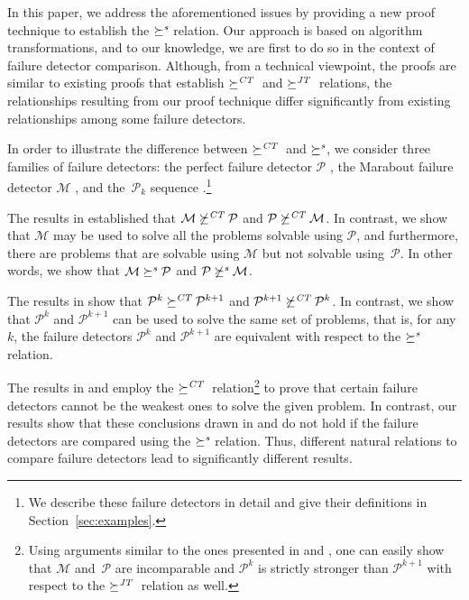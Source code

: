 \documentclass[11pt]{article}
\newcommand{\ident}[1]{\textit{#1}\rule{0cm}{1ex}}
\newcommand{\PFD}{\ensuremath{\mathcal{P}}}
\newcommand{\MFD}{\ensuremath{\mathcal{M}}}
\newcommand{\redCT}{\succeq^\ident{CT}}
\newcommand{\redJT}{\succeq^\ident{JT}}
\newcommand{\redSolv}{\succeq^{\ident{s}}}
\begin{document}
In this paper, we address the aforementioned issues by providing a new
     proof technique to establish the $\redSolv$ relation.
Our approach is based on algorithm transformations, and to our
     knowledge, we are first to do so in the context of failure
     detector comparison.
Although, from a technical viewpoint, the proofs are similar to
     existing proofs that establish $\redCT$ and $\redJT$ relations,
     the relationships resulting from our proof technique differ
     significantly from existing relationships among some failure
     detectors.
     
In order to illustrate the difference between $\redCT$ and $\redSolv$,
     we consider three families of failure detectors: the perfect
     failure detector $\PFD$ \cite{chan:ufdfr}, the Marabout failure
     detector $\MFD$ \cite{guer:01:hfap}, and the~$\PFD_{k}$ sequence
     \cite{bhatt:oteow}.\footnote{We describe these failure detectors
     in detail and give their definitions in
     Section~\ref{sec:examples}.} 

The results in \cite{guer:01:hfap} established that $\MFD \not\redCT
     \PFD$ and $\PFD \not\redCT \MFD$.
In contrast, we show that $\MFD$ may be used to solve all the problems
     solvable using $\PFD$, and furthermore, there are problems that
     are solvable using $\MFD$ but not solvable using~$\PFD$.
In other words, we show that $\MFD \redSolv \PFD$ and $\PFD
     \not\redSolv\MFD$.

The results in \cite{bhatt:oteow} show that $\PFD^k \redCT \PFD^{k+1}$
     and $\PFD^{k+1} \not\redCT \PFD^k$.
In contrast, we show that $\PFD^k$ and $\PFD^{k+1}$ can be used to
     solve the same set of problems, that is, for any $k$, the failure
     detectors  $\PFD^k$ and $\PFD^{k+1}$ are equivalent with respect
     to the $\redSolv$ relation.



The results in \cite{guer:01:hfap} and \cite{bhatt:oteow} employ  the
     $\redCT$ relation\footnote{Using arguments similar to the ones
     presented in \cite{guer:01:hfap} and \cite{bhatt:oteow}, one can
     easily show that $\MFD$ and~$\PFD$ are incomparable and $\PFD^k$
     is strictly stronger than $\PFD^{k+1}$  with respect to the
     $\redJT$ relation as well.} to prove that certain failure detectors
     cannot be the weakest ones to solve the given problem.
In contrast, our results show that these conclusions drawn in
     \cite{guer:01:hfap} and \cite{bhatt:oteow} do not hold if the
     failure detectors are compared using the $\redSolv$ relation.
Thus, different natural relations to compare failure detectors lead to
     significantly different results.
\end{document}
